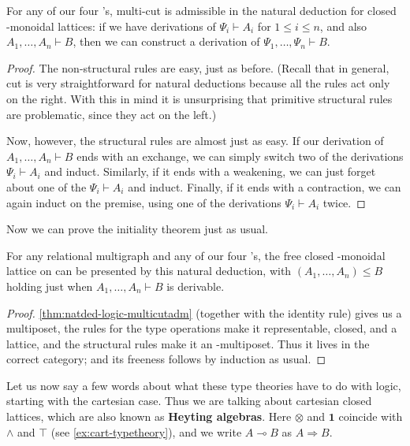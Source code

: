 \documentclass{book}
\let\types\vdash
\let\meet\wedge
\def\one{\mathbf{1}}
\let\tensor\otimes
\let\hom\multimap
\let\To\Rightarrow
\begin{document}
\begin{lem}\label{thm:natded-logic-multicutadm}
  For any of our four \fS's, multi-cut is admissible in the natural deduction for closed \fS-monoidal lattices: if we have derivations of $\Psi_i\types A_i$ for $1\le i\le n$, and also $A_1,\dots,A_n \types B$, then we can construct a derivation of $\Psi_1,\dots,\Psi_n\types B$.
\end{lem}
\begin{proof}
  The non-structural rules are easy, just as before.
  (Recall that in general, cut is very straightforward for natural deductions because all the rules act only on the right.
  With this in mind it is unsurprising that primitive structural rules are problematic, since they act on the left.)

  Now, however, the structural rules are almost just as easy.
  If our derivation of $A_1,\dots,A_n \types B$ ends with an exchange, we can simply switch two of the derivations $\Psi_i\types A_i$ and induct.
  Similarly, if it ends with a weakening, we can just forget about one of the $\Psi_i\types A_i$ and induct.
  Finally, if it ends with a contraction, we can again induct on the premise, using one of the derivations $\Psi_i\types A_i$ twice.
\end{proof}

Now we can prove the initiality theorem just as usual.

\begin{thm}\label{thm:natded-logic-initial}
  For any relational multigraph \cG and any of our four \fS's, the free closed \fS-monoidal lattice on \cG can be presented by this natural deduction, with $(A_1,\dots,A_n)\le B$ holding just when $A_1,\dots,A_n\types B$ is derivable.
\end{thm}
\begin{proof}
  \cref{thm:natded-logic-multicutadm} (together with the identity rule) gives us a multiposet, the rules for the type operations make it representable, closed, and a lattice, and the structural rules make it an \fS-multiposet.
  Thus it lives in the correct category; and its freeness follows by induction as usual.
\end{proof}

Let us now say a few words about what these type theories have to do with logic, starting with the cartesian case.
Thus we are talking about cartesian closed lattices, which are also known as \textbf{Heyting algebras}.
Here $\tensor$ and $\one$ coincide with $\meet$ and $\top$ (see \cref{ex:cart-typetheory}), and we write $A\hom B$ as $A\To B$.
\end{document}

